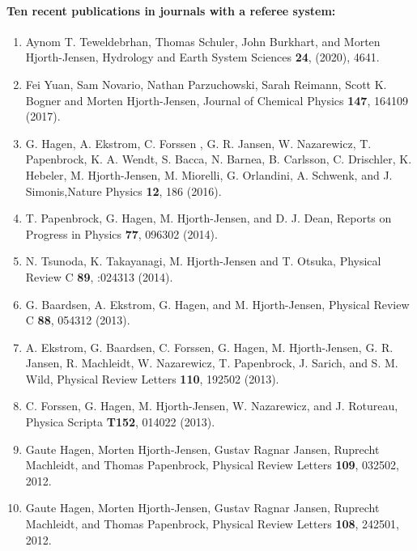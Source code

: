 \documentclass[11pt]{revtex4-1}
\begin{document}
\paragraph*{Ten recent publications in journals with a referee system:}
\begin{enumerate}

\item Aynom T. Teweldebrhan, Thomas Schuler, John Burkhart, and Morten Hjorth-Jensen, Hydrology and Earth System Sciences {\bf 24}, (2020), 4641.

\item Fei Yuan, Sam Novario, Nathan Parzuchowski, Sarah Reimann, Scott K. Bogner and Morten Hjorth-Jensen,  Journal of Chemical Physics {\bf 147}, 164109 (2017).



\item G. Hagen, A. Ekstrom, C. Forssen , G. R. Jansen, W. Nazarewicz, T. Papenbrock, K. A. Wendt, S. Bacca, N. Barnea, B. Carlsson, C. Drischler, K. Hebeler, M. Hjorth-Jensen, M. Miorelli, G. Orlandini, A. Schwenk, and J. Simonis,Nature Physics {\bf 12}, 186 (2016).


\item T. Papenbrock, G. Hagen, M. Hjorth-Jensen, and  D. J. Dean, Reports on Progress in Physics {\bf  77}, 096302 (2014).

\item N. Tsunoda, K. Takayanagi, M. Hjorth-Jensen and T. Otsuka, Physical Review C {\bf 89}, :024313 (2014).

\item G. Baardsen, A. Ekstrom, G. Hagen, and M. Hjorth-Jensen,  Physical Review C {\bf  88}, 054312 (2013).  


\item A. Ekstrom, G. Baardsen, C. Forssen, G. Hagen, M. Hjorth-Jensen, G. R. Jansen, R. Machleidt, W. Nazarewicz, T. Papenbrock, J. Sarich, and S. M. Wild,  Physical Review Letters {\bf  110}, 192502 (2013).  


\item C. Forssen, G. Hagen, M. Hjorth-Jensen, W. Nazarewicz, and J. Rotureau, Physica Scripta {\bf T152}, 014022 (2013). 


\item Gaute Hagen, Morten Hjorth-Jensen, Gustav Ragnar Jansen, Ruprecht Machleidt, and Thomas Papenbrock, Physical Review Letters {\bf 109}, 032502, 2012. 

\item Gaute Hagen, Morten Hjorth-Jensen, Gustav Ragnar Jansen, Ruprecht Machleidt, and Thomas Papenbrock, Physical Review Letters {\bf 108}, 242501, 2012.  
\end{enumerate}
\end{document}
